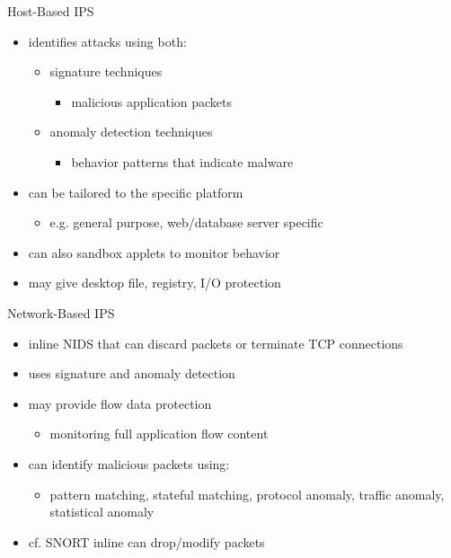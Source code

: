 \documentclass{beamer}
\begin{document}
\begin{frame}{Host-Based IPS}
  \begin{itemize}
  \item identifies attacks using both: 
    \begin{itemize}
    \item signature techniques 
      \begin{itemize}
      \item malicious application packets 
      \end{itemize}
    \item anomaly detection techniques 
      \begin{itemize}
      \item behavior patterns that indicate malware 
      \end{itemize}
    \end{itemize}
  \item can be tailored to the specific platform 
    \begin{itemize}
    \item e.g. general purpose, web/database server specific 
    \end{itemize}
  \item can also sandbox applets to monitor behavior 
  \item may give desktop file, registry, I/O protection
  \end{itemize}
\end{frame}

\begin{frame}{Network-Based IPS}
  \begin{itemize}
  \item inline NIDS that can discard packets or 
    terminate TCP connections 
  \item uses signature and anomaly detection 
  \item may provide flow data protection 
    \begin{itemize}
    \item monitoring full application flow content 
    \end{itemize}
  \item can identify malicious packets using: 
    \begin{itemize}
    \item pattern matching, stateful matching, protocol 
      anomaly, traffic anomaly, statistical anomaly 
    \end{itemize}
  \item cf. SNORT inline can drop/modify packets
  \end{itemize}
\end{frame}
\end{document}
